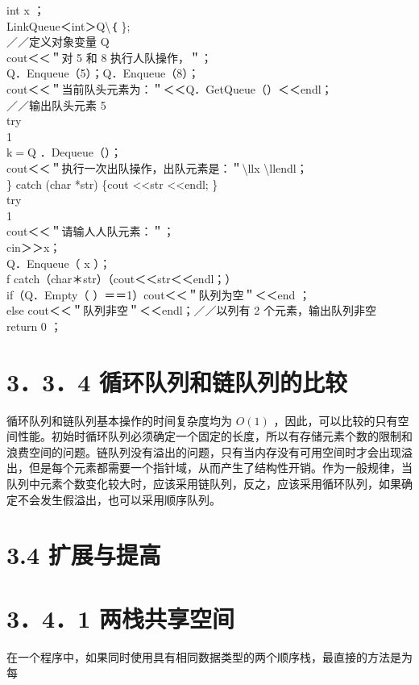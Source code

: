 \documentclass[10pt]{article}
\begin{document}
int x ；\\
LinkQueue＜int＞Q\textbackslash ｛ \};\\
／／定义对象变量 Q\\
cout＜＜＂对 5 和 8 执行人队操作，＂；\\
Q．Enqueue（5）；Q．Enqueue（8）；\\
cout＜＜＂当前队头元素为：＂＜＜Q．GetQueue（）＜＜endl；\\
／／输出队头元素 5\\
try\\
1\\
$\mathrm{k}=\mathrm{Q}$ ．Dequeue（）；\\
cout＜＜＂执行一次出队操作，出队元素是：＂\textbackslash llx \textbackslash llendl；\\
\} catch (char *str) \{cout <<str <<endl; \}\\
try\\
1\\
cout＜＜＂请输人人队元素：＂；\\
cin＞＞x；\\
Q．Enqueue（ x ）；\\
f catch（char＊str）（cout＜＜str＜＜endl；）\\
if（Q．Empty（ ）＝＝1）cout＜＜＂队列为空＂＜＜end ；\\
else cout＜＜＂队列非空＂＜＜endl；／／以列有 2 个元素，输出队列非空\\
return 0 ；

\section*{3．3．4 循环队列和链队列的比较}
循环队列和链队列基本操作的时间复杂度均为 $O(1)$ ，因此，可以比较的只有空间性能。初始时循环队列必须确定一个固定的长度，所以有存储元素个数的限制和浪费空间的问题。链队列没有溢出的问题，只有当内存没有可用空间时才会出现溢出，但是每个元素都需要一个指针域，从而产生了结构性开销。作为一般规律，当队列中元素个数变化较大时，应该采用链队列，反之，应该采用循环队列，如果确定不会发生假溢出，也可以采用顺序队列。

\section*{3.4 扩展与提高}
\section*{3．4．1 两栈共享空间}
在一个程序中，如果同时使用具有相同数据类型的两个顺序栈，最直接的方法是为每
\end{document}
